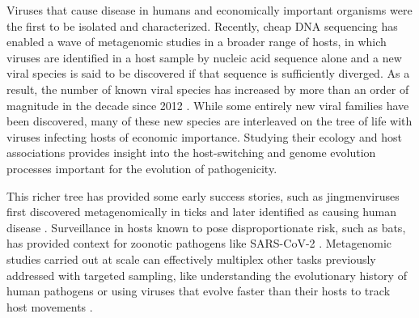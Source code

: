 \documentclass[11pt,twocolumn]{article}
\begin{document}
\twocolumn




Viruses that cause disease in humans and economically important organisms were the first to be isolated and characterized.
Recently, cheap DNA sequencing has enabled a wave of metagenomic studies in a broader range of hosts, in which viruses are identified in a host sample by nucleic acid sequence alone and a new viral species is said to be discovered if that sequence is sufficiently diverged. As a result, the number of known viral species has increased by more than an order of magnitude in the decade since 2012 \citep{roux_metagenomics_2021}.
While some entirely new viral families have been discovered, many of these new species are interleaved on the tree of life with viruses infecting hosts of economic importance. Studying their ecology \citep{shi_stable_2019} and host associations \citep{li_unprecedented_2015,shi_evolutionary_2018} provides insight into the host-switching and genome evolution processes important for the evolution of pathogenicity.

This richer tree has provided some early success stories, such as jingmenviruses first discovered metagenomically in ticks \citep{qin_tick-borne_2014} and later identified as causing human disease \citep{wang_new_2019}. Surveillance in hosts known to pose disproportionate risk, such as bats, \citep{ge_coexistence_2016} has provided context for zoonotic pathogens like SARS-CoV-2 \citep{wu_new_2020}.
Metagenomic studies carried out at scale can effectively multiplex other tasks previously addressed with targeted sampling, like understanding the evolutionary history of human pathogens \citep{keele_chimpanzee_2006} or using viruses that evolve faster than their hosts to track host movements \citep{wheeler_spatial_2010}.
\end{document}
